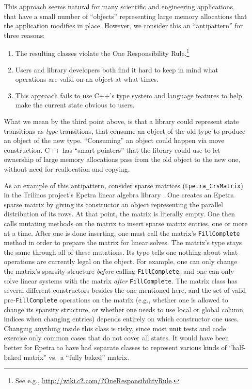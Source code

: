 This approach seems natural for many scientific and engineering
applications, that have a small number of ``objects'' representing
large memory allocations that the application modifies in place.
However, we consider this an ``antipattern'' for three reasons:
\begin{enumerate}
\item The resulting classes violate the One Responsibility
  Rule.\footnote{See e.g.,
    \url{http://wiki.c2.com/?OneResponsibilityRule}.}
\item Users and library developers both find it hard to keep in mind
  what operations are valid on an object at what times.
\item This approach fails to use C++'s type system and language
  features to help make the current state obvious to users.
\end{enumerate}
What we mean by the third point above, is that a library could
represent state transitions as \emph{type} transitions, that consume
an object of the old type to produce an object of the new type.
``Consuming'' an object could happen via move construction.  C++ has
``smart pointers'' that the library could use to let ownership of
large memory allocations pass from the old object to the new one,
without need for reallocation and copying.

As an example of this antipattern, consider sparse matrices
(\texttt{Epetra\_CrsMatrix}) in the Trilinos project's Epetra linear
algebra library \cite{heroux2005trilinos}.  One creates an Epetra
sparse matrix by giving its constructor an object representing the
parallel distribution of its rows.  At that point, the matrix is
literally empty.  One then calls mutating methods on the matrix to
insert sparse matrix entries, one or more at a time.  After one is
done inserting, one must call the matrix's \texttt{FillComplete}
method in order to prepare the matrix for linear solves.  The matrix's
type stays the same through all of these mutations.  Its type tells
one nothing about what operations are currently legal on the object.
For example, one can only change the matrix's sparsity structure
\emph{before} calling \texttt{FillComplete}, and one can only solve
linear systems with the matrix \emph{after} \texttt{FillComplete}.
The matrix class has several different constructors besides the one
mentioned here, and the set of valid pre-\texttt{FillComplete}
operations on the matrix (e.g., whether one is allowed to change its
sparsity structure, or whether one needs to use local or global column
indices when changing entries) depends entirely on which constructor
one uses.  Changing anything inside this class is risky, since most
unit tests and code exercise only common cases that do not cover all
states.  It would have been better for Epetra to have had separate
classes to represent various kinds of ``half-baked matrix'' vs.\ a
``fully baked'' matrix.  


